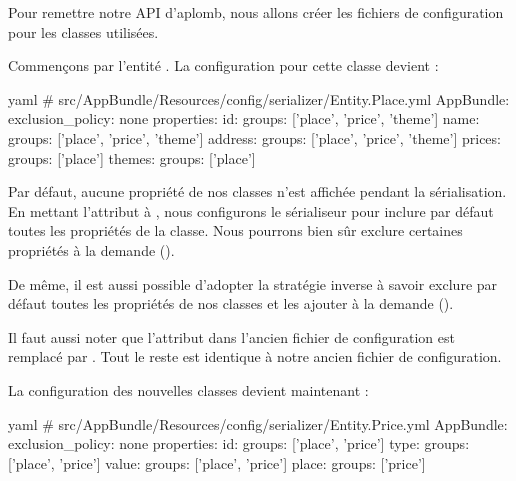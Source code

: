 \documentclass[big]{zmdocument}
\begin{document}


Pour remettre notre API d'aplomb, nous allons créer les fichiers de configuration pour les classes utilisées.



Commençons par l'entité . La configuration pour cette classe devient :



\begin{CodeBlock}{yaml}
# src/AppBundle/Resources/config/serializer/Entity.Place.yml
AppBundle\Entity\Place:
    exclusion_policy: none
    properties:
        id:
            groups: ['place', 'price', 'theme']
        name:
            groups: ['place', 'price', 'theme']
        address:
            groups: ['place', 'price', 'theme']
        prices:
            groups: ['place']
        themes:
            groups: ['place']
\end{CodeBlock}



Par défaut, aucune propriété de nos classes n'est affichée pendant la sérialisation. En mettant l'attribut  à , nous configurons le sérialiseur pour inclure par défaut toutes les propriétés de la classe. Nous pourrons bien sûr exclure certaines propriétés à la demande ().



De même, il est aussi possible d'adopter la stratégie inverse à savoir exclure par défaut toutes les propriétés de nos classes et les ajouter à la demande ().



Il faut aussi noter que l'attribut  dans l'ancien fichier de configuration est remplacé par . Tout le reste est identique à notre ancien fichier de configuration.



La configuration des nouvelles classes devient maintenant :



\begin{CodeBlock}{yaml}
# src/AppBundle/Resources/config/serializer/Entity.Price.yml
AppBundle\Entity\Price:
    exclusion_policy: none
    properties:
        id:
            groups: ['place', 'price']
        type:
            groups: ['place', 'price']
        value:
            groups: ['place', 'price']
        place:
            groups: ['price']
\end{CodeBlock}
\end{document}

